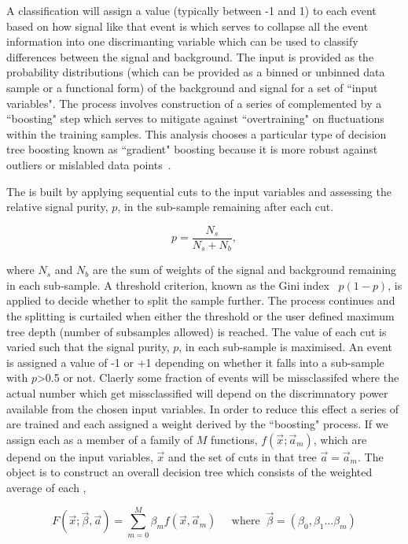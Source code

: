 A classification \BDT will assign a value (typically between -1 and 1) to each event based on how signal like that event is which serves to collapse all the event information into one discrimanting variable which can be used to classify differences between the signal and background. The input is provided as the probability distributions (which can be provided as a binned or unbinned data sample or a functional form) of the background and signal for a set of ``input variables". The process involves construction of a series of \DTs complemented by a ``boosting" step which serves to mitigate against ``overtraining" on fluctuations within the training samples. This analysis chooses a particular type of decision tree boosting known as ``gradient" boosting because it is more robust against outliers or mislabled data points~\cite{TMVA}.

The \DT is built by applying sequential cuts to the input variables and assessing the relative signal purity, $p$, in the sub-sample remaining after each cut.

\begin{equation}
  p = \frac{N_{s}}{N_{s}+N_{b}},
\end{equation}

where $N_{s}$ and $N_{b}$ are the sum of weights of the signal and background remaining in each sub-sample. A threshold criterion, known as the Gini index~\cite{TMVA} $p(1-p)$, is applied to decide whether to split the sample further. The process continues and the splitting is curtailed when either the threshold or the user defined maximum tree depth (number of subsamples allowed) is reached. The value of each cut is varied such that the signal purity, $p$, in each sub-sample is maximised. An event is assigned a value of -1 or +1 depending on whether it falls into a sub-sample with $p$>0.5 or not. Claerly some fraction of events will be missclassifed where the actual number which get missclassified will depend on the discrimnatory power available from the chosen input variables. In order to reduce this effect a series of \DTs are trained and each assigned a weight derived by the ``boosting" process. 
If we assign each \DT as a member of a family of $M$ functions, $f(\vec{x};\vec{a}_{m})$, which are depend on the input variables, $\vec{x}$ and the set of cuts in that tree $\vec{a}=\vec{a}_{m}$. The object is to construct an overall decision tree which consists of the weighted average of each \DT,

\begin{equation}
  F(\vec{x};\vec{\beta},\vec{a}) = \sum_{m=0}^{M} \beta_{m}f(\vec{x},\vec{a}_{m}) \;\;\;\;\; \textrm{where} \;\; \vec{\beta} = (\beta_{0},\beta_{1}...\beta_{m})
\end{equation}

